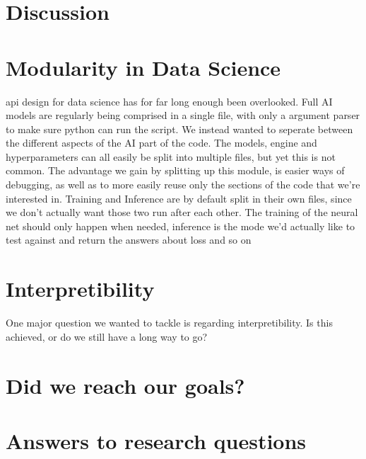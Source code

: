 \section{Discussion}
\label{chap:discussion}

\section{Modularity in Data Science}

api design for data science has for far long enough been overlooked. Full AI models are regularly being comprised in a single file, with only a argument parser to make sure python can run the script. We instead wanted to seperate between the different aspects of the AI part of the code. The models, engine and hyperparameters can all easily be split into multiple files, but yet this is not common. The advantage we gain by splitting up this module, is easier ways of debugging, as well as to more easily reuse only the sections of the code that we're interested in. Training and Inference are by default split in their own files, since we don't actually want those two run after each other. The training of the neural net should only happen when needed, inference is the mode we'd actually like to test against and return the answers about loss and so on 


\section{Interpretibility}
One major question we wanted to tackle is regarding interpretibility. Is this achieved, or do we still have a long way to go?

\section{Did we reach our goals?}



\section{Answers to research questions}